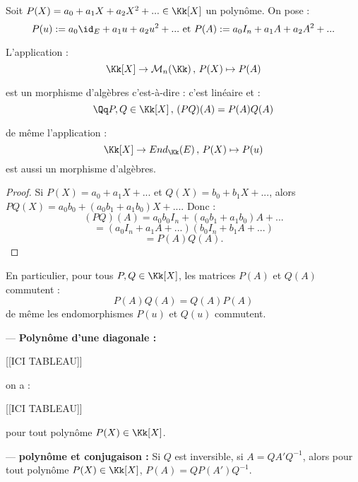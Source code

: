 \documentclass[class=report,crop=false]{standalone}
\newcommand{\End}{End}
\begin{document}
Soit $P(X) = a_0 + a_1 X +a_2 X^2 + ... \in\Kk[X]$ un polynôme. On pose :
\[P(u) := a_0\id_E +a_1u + a_2 u^2 + ... \text{ et } P(A) := a_0 I_n +a_1 A +a_2 A^2 +...\] 

\begin{proposition}
L'application :
\[\Kk[X] \to \mathcal{M}_n(\Kk) \,,\, P(X) \mapsto P(A)\]

est un morphisme d'algèbres c'est-à-dire : c'est linéaire et :
\[\Qq P,Q\in \Kk[X]\,,\, (PQ)(A) = P(A)Q(A)\]

de même l'application :
\[\Kk[X] \to \End_\Kk(E) \,,\, P(X) \mapsto P(u)\]
est aussi un morphisme d'algèbres.
\end{proposition}

\begin{proof}
Si $P(X) = a_0 + a_1X +...$ et $Q(X) = b_0 + b_1X + ...$, alors $PQ(X) = a_0b_0 +(a_0 b_1 + a_1b_0) X + ...$. Donc :
\[(PQ)(A) = a_0b_0 I_n + (a_0b_1 + a_1b_0) A + ...\]
\[= (a_0 I_n + a_1 A +...)(b_0 I_n +b_1 A + ...) \]
\[= P(A) Q(A) .\]
\end{proof}

\begin{remarque*}[importante]
En particulier, pour tous $P,Q \in \Kk[X]$, les matrices $P(A)$ et $Q(A)$ commutent :
\[P(A) Q(A) = Q(A)P(A)\]
de même les endomorphismes $P(u)$ et $Q(u)$ commutent.
\end{remarque*}

\begin{exemple}
--- {\bf Polynôme d'une diagonale :}

[[ICI TABLEAU]]

on a :

[[ICI TABLEAU]]


pour tout polynôme $P(X) \in \Kk[X]$.

--- {\bf polynôme et conjugaison :} Si $Q$ est inversible, si $A =Q A'Q^{-1}$, alors pour tout polynôme $P(X) \in \Kk[X]$, $P(A) = Q P(A')Q^{-1}$.
\end{exemple}
\end{document}

